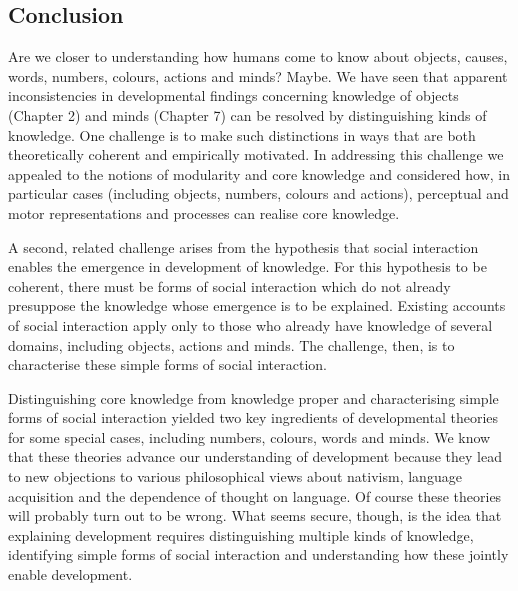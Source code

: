 \documentclass[12pt,\papersize]{extarticle}
\begin{document}

\subsection{Conclusion}
Are we closer to understanding 
how humans come to know about %
objects,
causes,
words,
numbers,
colours,
actions
and
minds? 
Maybe.
We have seen that apparent inconsistencies in developmental findings concerning knowledge of objects (Chapter 2) and minds (Chapter 7) can be resolved by distinguishing kinds of knowledge.
One challenge is to make such distinctions in ways that are both  theoretically coherent and empirically motivated.
In addressing this challenge we appealed to the notions of modularity and core knowledge and considered how, in particular cases (including objects, numbers, colours and actions), perceptual and motor representations and processes can realise core knowledge.

A second, related challenge arises from the hypothesis that social interaction enables the emergence in development of knowledge.  
For this hypothesis to be coherent, there must be forms of social interaction which do not already presuppose the knowledge whose emergence is to be explained.
Existing accounts of social interaction apply only to those who already have knowledge of several domains, including objects, actions and minds.
The challenge, then, is to characterise these simple forms of social interaction.

Distinguishing core knowledge from knowledge proper 
and
characterising simple forms of social interaction
yielded 
two key ingredients of
developmental theories for some special cases, including numbers, colours, words and minds.
We know that these  theories advance our understanding of development because they lead to new objections to various philosophical views about nativism, language acquisition and the dependence of thought on language.
Of course these theories will probably turn out to be wrong.
What seems secure, though, is the idea that explaining development requires 
distinguishing multiple kinds of knowledge, 
identifying simple forms of social interaction 
and 
understanding how 
	these jointly enable development.






\end{document}

